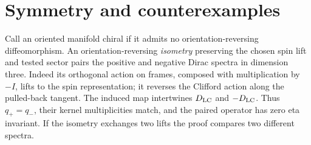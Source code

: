 \section{Symmetry and counterexamples}\label{sec:independence}
Call an oriented manifold chiral if it admits no orientation-reversing diffeomorphism. An orientation-reversing \emph{isometry} preserving the chosen spin lift and tested sector pairs the positive and negative Dirac spectra in dimension three. Indeed its orthogonal action on frames, composed with multiplication by \(-I\), lifts to the spin representation; it reverses the Clifford action along the pulled-back tangent. The induced map intertwines \(D_{\mathrm{LC}}\) and \(-D_{\mathrm{LC}}\). Thus \(q_+=q_-\), their kernel multiplicities match, and the paired operator has zero eta invariant. If the isometry exchanges two lifts the proof compares two different spectra.

